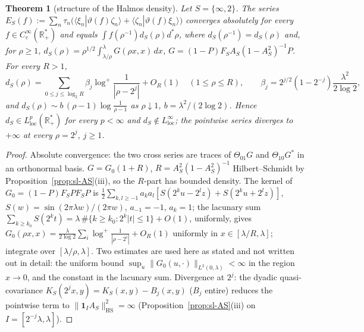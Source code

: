 \documentclass[11pt]{amsart}
\newtheorem{theorem}{Theorem}[section]
\theoremstyle{definition}
\theoremstyle{remark}
\newcommand{\R}{\mathbb R}
\begin{document}
\begin{theorem}[structure of the Halmos density]\label{thm:sl-L2}
Let $S=\{\infty,2\}$. The series $E_S(f):=\sum_n\tau_n\big(\langle\xi_n|\vartheta(f)\zeta_n\rangle+\langle\zeta_n|\vartheta(f)\xi_n\rangle\big)$
converges absolutely for every $f\in C_c^\infty(\R_+^*)$ and equals $\int f(\rho^{-1})d_S(\rho)d^*\rho$, where
$d_S(\rho^{-1})=d_S(\rho)$ and, for $\rho\ge1$,
$d_S(\rho)=\rho^{1/2}\int_{\lambda/\rho}^{\lambda}G(\rho x,x)\,dx$, $G=(1-P)F_SA_S(1-A_S^2)^{-1}P$. For every $R>1$,
\[
d_S(\rho)=\sum_{0\le j\le\log_2R}\beta_j\log^+\frac1{|\rho-2^j|}+O_R(1)\quad(1\le\rho\le R),\qquad
\beta_j=2^{j/2}(1-2^{-j})\frac{\lambda^2}{2\log2},
\]
and $d_S(\rho)\sim b\,(\rho-1)\log\frac1{\rho-1}$ as $\rho\downarrow1$, $b=\lambda^2/(2\log2)$. Hence
$d_S\in L^p_{\mathrm{loc}}(\R_+^*)$ for every $p<\infty$ and $d_S\notin L^\infty_{\mathrm{loc}}$; the pointwise series
diverges to $+\infty$ at every $\rho=2^j$, $j\ge1$.
\end{theorem}
\begin{proof}
Absolute convergence: the two cross series are traces of $\Theta_{01}G$ and $\Theta_{10}G^*$ in an orthonormal basis.
$G=G_0(1+R)$, $R=A_S^2(1-A_S^2)^{-1}$ Hilbert--Schmidt by Proposition~\ref{prop:sl-AS}(iii), so the $R$-part has
bounded density. The kernel of $G_0=(1-P)F_SPF_SP$ is
$\frac12\sum_{k,l\ge-1}a_ka_l[S(2^ku-2^lz)+S(2^ku+2^lz)]$, $S(w)=\sin(2\pi\lambda w)/(2\pi w)$, $a_{-1}=-1$, $a_k=1$;
the lacunary sum $\sum_{k\ge k_0}S(2^kt)=\lambda\,\#\{k\ge k_0:2^k|t|\le1\}+O(1)$, uniformly, gives
$G_0(\rho x,x)=\frac{\lambda}{2\log2}\sum_i\log^+\frac1{|\rho-2^i|}+O_R(1)$ uniformly in $x\in[\lambda/R,\lambda]$;
integrate over $[\lambda/\rho,\lambda]$. Two estimates are used here as stated and not written out in detail: the
uniform bound $\sup_u\|G_0(u,\cdot)\|_{L^2(0,\lambda)}<\infty$ in the region $x\to0$, and the constant in the lacunary
sum. Divergence at $2^j$: the dyadic quasi-covariance
$K_S(2^jx,y)=K_S(x,y)-B_j(x,y)$ ($B_j$ entire) reduces the pointwise term to $\|\mathbf 1_{I}A_S\|_{\mathrm{HS}}^2=\infty$
(Proposition~\ref{prop:sl-AS}(iii) on $I=[2^{-j}\lambda,\lambda]$).
\end{proof}
\end{document}

